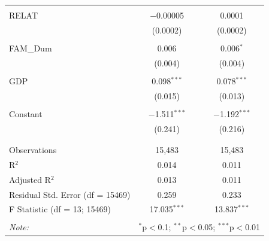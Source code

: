 \documentclass[a4paper]{article}\usepackage[]{graphicx}\usepackage[]{color}
\begin{document}
\begin{table}[!htbp]
\begin{tabular}{@{\extracolsep{5pt}}lcc}
  & & \\ 
 RELAT & $-$0.00005 & 0.0001 \\ 
  & (0.0002) & (0.0002) \\ 
  & & \\ 
 FAM\_Dum & 0.006 & 0.006$^{*}$ \\ 
  & (0.004) & (0.004) \\ 
  & & \\ 
 GDP & 0.098$^{***}$ & 0.078$^{***}$ \\ 
  & (0.015) & (0.013) \\ 
  & & \\ 
 Constant & $-$1.511$^{***}$ & $-$1.192$^{***}$ \\ 
  & (0.241) & (0.216) \\ 
  & & \\ 
\hline \\[-1.8ex] 
Observations & 15,483 & 15,483 \\ 
R$^{2}$ & 0.014 & 0.011 \\ 
Adjusted R$^{2}$ & 0.013 & 0.011 \\ 
Residual Std. Error (df = 15469) & 0.259 & 0.233 \\ 
F Statistic (df = 13; 15469) & 17.035$^{***}$ & 13.837$^{***}$ \\ 
\hline 
\hline \\[-1.8ex] 
\textit{Note:}  & \multicolumn{2}{r}{$^{*}$p$<$0.1; $^{**}$p$<$0.05; $^{***}$p$<$0.01} \\ 
\end{tabular} 
\end{table} 




\newpage
\end{document}

